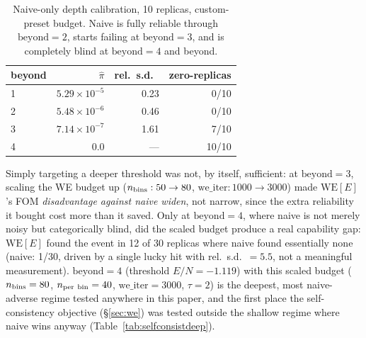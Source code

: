 \documentclass[a4paper,fleqn]{cas-sc}
\begin{document}
\begin{table}[H]
	\centering\small
	\caption{Naive-only depth calibration, 10 replicas, custom-preset budget. Naive is
		fully reliable through $\mathrm{beyond}=2$, starts failing at $\mathrm{beyond}=3$,
		and is completely blind at $\mathrm{beyond}=4$ and beyond.}
	\label{tab:deeprare}
	\begin{tabular}{lrrr}
		\toprule
		beyond & $\hat\pi$ & rel.\ s.d.\ & zero-replicas \\
		\midrule
		1 & $5.29\times10^{-5}$ & 0.23 & 0/10 \\
		2 & $5.48\times10^{-6}$ & 0.46 & 0/10 \\
		3 & $7.14\times10^{-7}$ & 1.61 & 7/10 \\
		4 & $0.0$ & --- & 10/10 \\
		\bottomrule
	\end{tabular}
\end{table}

Simply targeting a deeper threshold was not, by itself, sufficient: at $\mathrm{beyond}=3$,
scaling the WE budget up ($n_{\rm bins}:50\to80$, $\mathrm{we\_iter}:1000\to3000$) made
$\mathrm{WE}[E]$'s FOM \emph{disadvantage against naive widen}, not narrow, since the
extra reliability it bought cost more than it saved. Only at $\mathrm{beyond}=4$, where
naive is not merely noisy but categorically blind, did the scaled budget produce a real
capability gap: $\mathrm{WE}[E]$ found the event in 12 of 30 replicas where naive found
essentially none (naive: 1/30, driven by a single lucky hit with rel.\ s.d.\ $=5.5$, not
a meaningful measurement). $\mathrm{beyond}=4$ (threshold $E/N=-1.119$) with this scaled
budget ($n_{\rm bins}=80$, $n_{\rm per\ bin}=40$, $\mathrm{we\_iter}=3000$, $\tau=2$) is
the deepest, most naive-adverse regime tested anywhere in this paper, and the first
place the self-consistency objective (\S\ref{sec:we}) was tested outside the
shallow regime where naive wins anyway (Table~\ref{tab:selfconsistdeep}).
\end{document}
